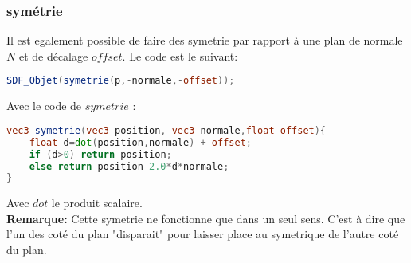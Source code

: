 \newpage
\subsubsection{symétrie}
Il est egalement possible de faire des symetrie par rapport à une plan de normale $N$ et de décalage $offset$. Le code est le suivant:
\begin{lstlisting}[language=GLSL]
SDF_Objet(symetrie(p,-normale,-offset));
\end{lstlisting}
Avec le code de $symetrie$ :
\begin{lstlisting}[language=GLSL]
vec3 symetrie(vec3 position, vec3 normale,float offset){
    float d=dot(position,normale) + offset;
    if (d>0) return position;
    else return position-2.0*d*normale;
}
\end{lstlisting}
Avec $dot$ le produit scalaire.
\\\textbf{Remarque:} Cette symetrie ne fonctionne que dans un seul sens. C'est à dire que l'un des coté du plan "disparait" pour laisser place au symetrique de l'autre coté du plan.